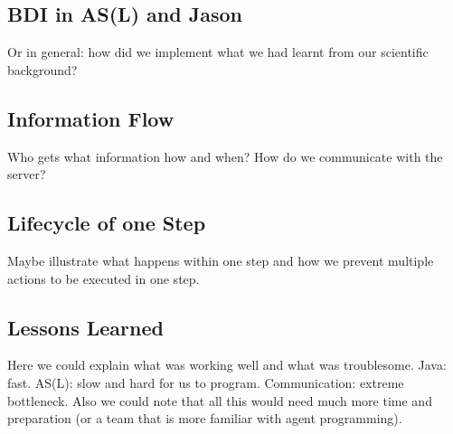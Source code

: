 \subsection{BDI in AS(L) and Jason}
Or in general: how did we implement what we had learnt from our scientific background?
\subsection{Information Flow}
Who gets what information how and when? How do we communicate with the server?
\subsection{Lifecycle of one Step}
Maybe illustrate what happens within one step and how we prevent multiple actions to be executed in one step.
\subsection{Lessons Learned}
Here we could explain what was working well and what was troublesome. Java: fast. AS(L): slow and hard for us to program. Communication: extreme bottleneck. Also we could note that all this would need much more time and preparation (or a team that is more familiar with agent programming).
